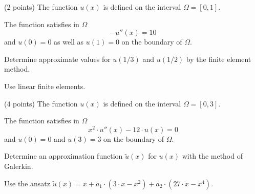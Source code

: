 \begin{teilaufgaben}
\item (2 points)
The function $u(x)$ is defined on the interval $\Omega = [0, 1].$

\vspace{2mm}

The function satisfies in $\Omega$ 
\[
-u''(x) = 10
\]
and $u(0) = 0$ as well as $u(1) = 0$ on the boundary of $\Omega$.  

\vspace{2mm}

Determine approximate values for $u(1/3)$ and $u(1/2)$ by the finite
element method. 

\vspace{2mm}

Use linear finite elements.

\item (4 points)
The function $u(x)$ is defined on the interval $\Omega = [0, 3].$

\vspace{2mm}

The function satisfies in $\Omega$ 
\[
x^2 \cdot u''(x) - 12 \cdot u(x) = 0
\]
and $u(0) = 0$ and $u(3) = 3$ on the boundary of $\Omega$.  

\vspace{2mm}

Determine an approximation function $\tilde u(x)$ for $u(x)$ with the
method of Galerkin.

\vspace{2mm}

Use the ansatz
$\tilde u(x)
=
x + a_1 \cdot (3 \cdot x - x^2) + a_2 \cdot (27 \cdot x - x^4)$.
\end{teilaufgaben}



